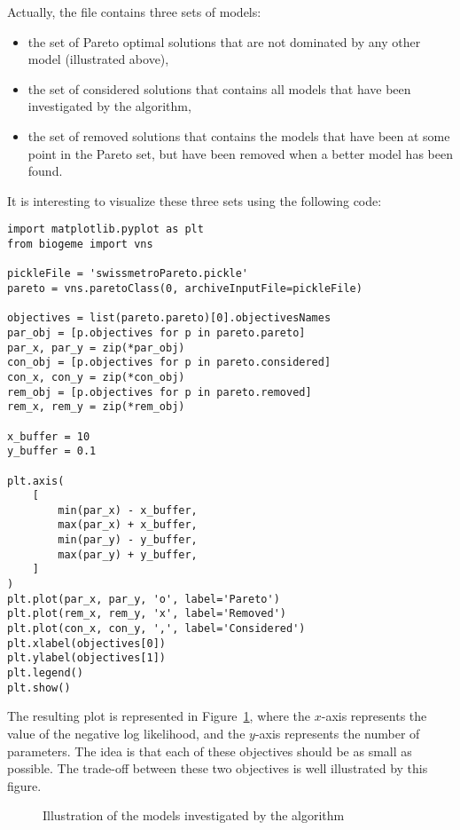 \documentclass[12pt,a4paper]{article}
\begin{document}
Actually, the \lstinline@pickle@ file contains  three sets of models:
\begin{itemize}
  \item the set of Pareto optimal solutions that are not dominated by
    any other model (illustrated above),
  \item the set of considered solutions that contains all models that
    have been investigated by the algorithm,
  \item the set of removed solutions that contains the models that
    have been at some point in the Pareto set, but have been removed
    when a better model has been found. 
\end{itemize}

It is interesting to visualize these three sets using the following code:
\begin{lstlisting}
import matplotlib.pyplot as plt
from biogeme import vns

pickleFile = 'swissmetroPareto.pickle'
pareto = vns.paretoClass(0, archiveInputFile=pickleFile)

objectives = list(pareto.pareto)[0].objectivesNames
par_obj = [p.objectives for p in pareto.pareto]
par_x, par_y = zip(*par_obj)
con_obj = [p.objectives for p in pareto.considered]
con_x, con_y = zip(*con_obj)
rem_obj = [p.objectives for p in pareto.removed]
rem_x, rem_y = zip(*rem_obj)

x_buffer = 10
y_buffer = 0.1

plt.axis(
    [
        min(par_x) - x_buffer,
        max(par_x) + x_buffer,
        min(par_y) - y_buffer,
        max(par_y) + y_buffer,
    ]
)
plt.plot(par_x, par_y, 'o', label='Pareto')
plt.plot(rem_x, rem_y, 'x', label='Removed')
plt.plot(con_x, con_y, ',', label='Considered')
plt.xlabel(objectives[0])
plt.ylabel(objectives[1])
plt.legend()
plt.show()
\end{lstlisting}
The resulting plot is represented in Figure~\ref{fig:pareto}, where
the $x$-axis represents the value of the negative log likelihood, and
the $y$-axis represents the number of parameters. The idea is that
each of these objectives should be as small as possible. The trade-off
between these two objectives is well illustrated by this figure.
\begin{figure}
  \begin{center}
  \end{center}
  \caption{\label{fig:pareto}Illustration of the models investigated
    by the algorithm}
\end{figure}
\end{document}
